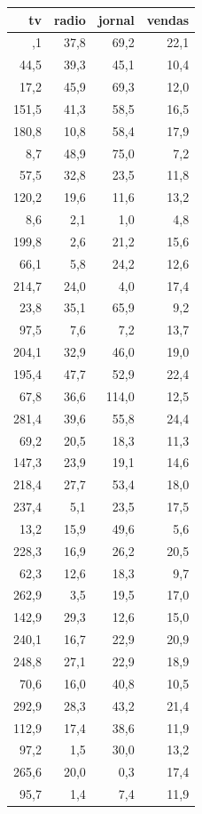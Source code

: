 \documentclass[
  letterpaper,
  DIV=11,
  numbers=noendperiod]{scrreprt}
\begin{document}
\begin{longtable*}{rrrr}
\toprule
tv & radio & jornal & vendas \\ 
\midrule{},1 & 37,8 & 69,2 & 22,1 \\ 
44,5 & 39,3 & 45,1 & 10,4 \\ 
17,2 & 45,9 & 69,3 & 12,0 \\ 
151,5 & 41,3 & 58,5 & 16,5 \\ 
180,8 & 10,8 & 58,4 & 17,9 \\ 
8,7 & 48,9 & 75,0 & 7,2 \\ 
57,5 & 32,8 & 23,5 & 11,8 \\ 
120,2 & 19,6 & 11,6 & 13,2 \\ 
8,6 & 2,1 & 1,0 & 4,8 \\ 
199,8 & 2,6 & 21,2 & 15,6 \\ 
66,1 & 5,8 & 24,2 & 12,6 \\ 
214,7 & 24,0 & 4,0 & 17,4 \\ 
23,8 & 35,1 & 65,9 & 9,2 \\ 
97,5 & 7,6 & 7,2 & 13,7 \\ 
204,1 & 32,9 & 46,0 & 19,0 \\ 
195,4 & 47,7 & 52,9 & 22,4 \\ 
67,8 & 36,6 & 114,0 & 12,5 \\ 
281,4 & 39,6 & 55,8 & 24,4 \\ 
69,2 & 20,5 & 18,3 & 11,3 \\ 
147,3 & 23,9 & 19,1 & 14,6 \\ 
218,4 & 27,7 & 53,4 & 18,0 \\ 
237,4 & 5,1 & 23,5 & 17,5 \\ 
13,2 & 15,9 & 49,6 & 5,6 \\ 
228,3 & 16,9 & 26,2 & 20,5 \\ 
62,3 & 12,6 & 18,3 & 9,7 \\ 
262,9 & 3,5 & 19,5 & 17,0 \\ 
142,9 & 29,3 & 12,6 & 15,0 \\ 
240,1 & 16,7 & 22,9 & 20,9 \\ 
248,8 & 27,1 & 22,9 & 18,9 \\ 
70,6 & 16,0 & 40,8 & 10,5 \\ 
292,9 & 28,3 & 43,2 & 21,4 \\ 
112,9 & 17,4 & 38,6 & 11,9 \\ 
97,2 & 1,5 & 30,0 & 13,2 \\ 
265,6 & 20,0 & 0,3 & 17,4 \\ 
95,7 & 1,4 & 7,4 & 11,9 \\ 

\end{longtable*}
\end{document}
